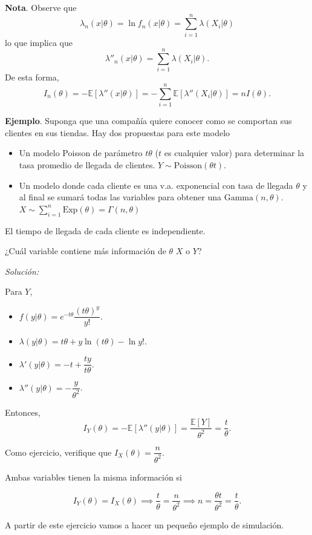 \documentclass[
  12pt,
]{book}
\begin{document}
\textbf{Nota}. Observe que
\[\lambda_n(x|\theta) = \ln f_n(x|\theta) = \sum_{i=1}^{n} \lambda(X_i|\theta)\]
lo que implica que
\[\lambda''_n(x|\theta) = \sum_{i=1}^n\lambda(X_i|\theta).\]
De esta forma,
\[I_n(\theta) = -\mathbb E[\lambda''(x|\theta)] = - \sum_{i=1}^n\mathbb E[\lambda''(X_i|\theta)] = nI(\theta).\]

\textbf{Ejemplo}. Suponga que una compañía quiere conocer como se comportan sus clientes en sus tiendas. Hay dos propuestas para este modelo

\begin{itemize}
\item
  Un modelo Poisson de parámetro \(t\theta\) (\(t\) es cualquier valor) para determinar la tasa promedio de llegada de clientes. \(Y\sim \text{Poisson}(\theta t)\).
\item
  Un modelo donde cada cliente es una v.a. exponencial con tasa de llegada \(\theta\) y al final se sumará todas las variables para obtener una \(\mathrm{Gamma}(n,\theta)\). \(X\sim \sum_{i=1}^{n}\text{Exp}(\theta) = \Gamma(n,\theta)\)
\end{itemize}

El tiempo de llegada de cada cliente es independiente.

¿Cuál variable contiene más información de \(\theta\) \(X\) o \(Y\)?

\emph{Solución:}

Para \(Y\),

\begin{itemize}
\item
  \(f(y|\theta) = e^{-t\theta}\dfrac{(t\theta)^y}{y!}\).
\item
  \(\lambda(y|\theta) = t\theta + y\ln (t\theta) - \ln y!\).
\item
  \(\lambda'(y|\theta) = -t+\dfrac{ty}{t\theta}.\)
\item
  \(\lambda''(y|\theta) = -\dfrac y{\theta^2}\).
\end{itemize}

Entonces,
\[I_Y(\theta) =-\mathbb E[ \lambda''(y|\theta)] = \dfrac{\mathbb E[Y]}{\theta^2} = \dfrac{t}\theta.\]

Como ejercicio, verifique que \(I_X(\theta) = \dfrac n{\theta^2}\).

Ambas variables tienen la misma información si

\[I_Y(\theta) = I_X(\theta) \implies \dfrac t\theta = \dfrac n{\theta^2} \implies n = \dfrac{\theta t}{\theta ^{2}} = \dfrac t\theta.\]

A partir de este ejercicio vamos a hacer un pequeño ejemplo de simulación.
\end{document}
